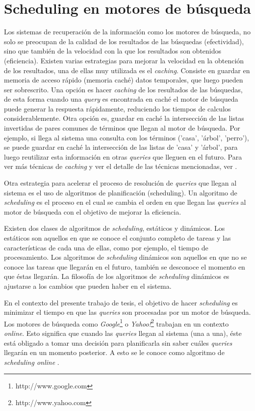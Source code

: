 \section{Scheduling en motores de búsqueda}
\label{marco:scheduling}
Los sistemas de recuperación de la información como los motores de búsqueda, no solo se preocupan de la calidad de los resultados de las búsquedas (efectividad), sino que también de la velocidad con la que los resultados son obtenidos (eficiencia). Existen varias estrategias para mejorar la velocidad en la obtención de los resultados, una de ellas muy utilizada es el \textit{caching}. Consiste en guardar en memoria de acceso rápido (memoria caché) datos temporales, que luego pueden ser sobrescrito. Una opción es hacer \textit{caching} de los resultados de las búsquedas, de esta forma cuando una \textit{query} es encontrada en caché el motor de búsqueda puede generar la respuesta rápidamente, reduciendo los tiempos de calculos considerablemente. Otra opción es, guardar en caché la intersección de las listas invertidas de pares comunes de términos que llegan al motor de búsqueda. Por ejemplo, si llega al sistema una consulta con los términos ('casa', 'árbol', 'perro'), se puede guardar en caché la intersección de las listas de 'casa' y 'árbol', para luego reutilizar esta información en otras \textit{queries} que lleguen en el futuro. Para ver más técnicas de \textit{caching} y ver el detalle de las técnicas mencionadas, ver \citep{Buttcher:2010}. 

Otra estrategia para acelerar el proceso de resolución de \textit{queries} que llegan al sistema es el uso de algoritmos de planificación (scheduling). Un algoritmo de \textit{scheduling} es el proceso en el cual se cambia el orden en que llegan las \textit{queries} al motor de búsqueda con el objetivo de mejorar la eficiencia. 

Existen dos clases de algoritmos de \textit{scheduling}, estáticos y dinámicos. Los estáticos son aquellos en que se conoce el conjunto completo de tareas y las características de cada una de ellas, como por ejemplo, el tiempo de procesamiento. Los algoritmos de \textit{scheduling} dinámicos son aquellos en que no se conoce las tareas que llegarán en el futuro, también se desconoce el momento en que éstas llegarán. La filosofía de los algoritmos de \textit{scheduling} dinámicos es ajustarse a los cambios que pueden haber en el sistema.

En el contexto del presente trabajo de tesis, el objetivo de hacer \textit{scheduling} es minimizar el tiempo en que las \textit{queries} son procesadas por un motor de búsqueda. Los motores de búsqueda como \textit{Google}\footnote{http://www.google.com} o \textit{Yahoo!}\footnote{http://www.yahoo.com} trabajan en un contexto \textit{online}. Esto significa que cuando las \textit{queries} llegan al sistema (una a una), éste está obligado a tomar una decisión para planificarla sin saber cuáles \textit{queries} llegarán en un momento posterior. A esto se le conoce como algoritmo de \textit{scheduling online} \citep{Albers:2003, Borodin:1998}.

